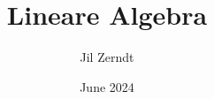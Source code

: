 \documentclass[a4paper, fontsize = 8pt, landscape]{scrartcl}
\title{Lineare Algebra}
\author{Jil Zerndt}
\date{June 2024}
\begin{document}
\begin{multicols*}{3}
    \thispagestyle{TitlePageStyle}
		\maketitle
    
    \raggedcolumns
    \columnbreak
    
    \raggedcolumns
    \newpage
    
    \raggedcolumns
    
    \raggedcolumns
    
    \raggedcolumns
    
    \raggedcolumns
    
    

\end{multicols*}
\end{document}
